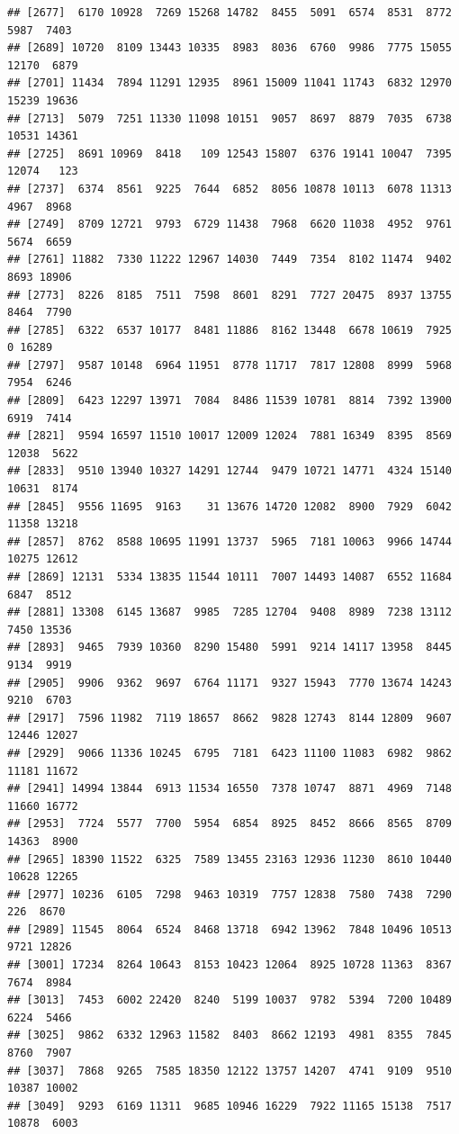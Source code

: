 \documentclass[
]{article}
\begin{document}
\begin{verbatim}
## [2677]  6170 10928  7269 15268 14782  8455  5091  6574  8531  8772  5987  7403
## [2689] 10720  8109 13443 10335  8983  8036  6760  9986  7775 15055 12170  6879
## [2701] 11434  7894 11291 12935  8961 15009 11041 11743  6832 12970 15239 19636
## [2713]  5079  7251 11330 11098 10151  9057  8697  8879  7035  6738 10531 14361
## [2725]  8691 10969  8418   109 12543 15807  6376 19141 10047  7395 12074   123
## [2737]  6374  8561  9225  7644  6852  8056 10878 10113  6078 11313  4967  8968
## [2749]  8709 12721  9793  6729 11438  7968  6620 11038  4952  9761  5674  6659
## [2761] 11882  7330 11222 12967 14030  7449  7354  8102 11474  9402  8693 18906
## [2773]  8226  8185  7511  7598  8601  8291  7727 20475  8937 13755  8464  7790
## [2785]  6322  6537 10177  8481 11886  8162 13448  6678 10619  7925     0 16289
## [2797]  9587 10148  6964 11951  8778 11717  7817 12808  8999  5968  7954  6246
## [2809]  6423 12297 13971  7084  8486 11539 10781  8814  7392 13900  6919  7414
## [2821]  9594 16597 11510 10017 12009 12024  7881 16349  8395  8569 12038  5622
## [2833]  9510 13940 10327 14291 12744  9479 10721 14771  4324 15140 10631  8174
## [2845]  9556 11695  9163    31 13676 14720 12082  8900  7929  6042 11358 13218
## [2857]  8762  8588 10695 11991 13737  5965  7181 10063  9966 14744 10275 12612
## [2869] 12131  5334 13835 11544 10111  7007 14493 14087  6552 11684  6847  8512
## [2881] 13308  6145 13687  9985  7285 12704  9408  8989  7238 13112  7450 13536
## [2893]  9465  7939 10360  8290 15480  5991  9214 14117 13958  8445  9134  9919
## [2905]  9906  9362  9697  6764 11171  9327 15943  7770 13674 14243  9210  6703
## [2917]  7596 11982  7119 18657  8662  9828 12743  8144 12809  9607 12446 12027
## [2929]  9066 11336 10245  6795  7181  6423 11100 11083  6982  9862 11181 11672
## [2941] 14994 13844  6913 11534 16550  7378 10747  8871  4969  7148 11660 16772
## [2953]  7724  5577  7700  5954  6854  8925  8452  8666  8565  8709 14363  8900
## [2965] 18390 11522  6325  7589 13455 23163 12936 11230  8610 10440 10628 12265
## [2977] 10236  6105  7298  9463 10319  7757 12838  7580  7438  7290   226  8670
## [2989] 11545  8064  6524  8468 13718  6942 13962  7848 10496 10513  9721 12826
## [3001] 17234  8264 10643  8153 10423 12064  8925 10728 11363  8367  7674  8984
## [3013]  7453  6002 22420  8240  5199 10037  9782  5394  7200 10489  6224  5466
## [3025]  9862  6332 12963 11582  8403  8662 12193  4981  8355  7845  8760  7907
## [3037]  7868  9265  7585 18350 12122 13757 14207  4741  9109  9510 10387 10002
## [3049]  9293  6169 11311  9685 10946 16229  7922 11165 15138  7517 10878  6003

\end{verbatim}
\end{document}
